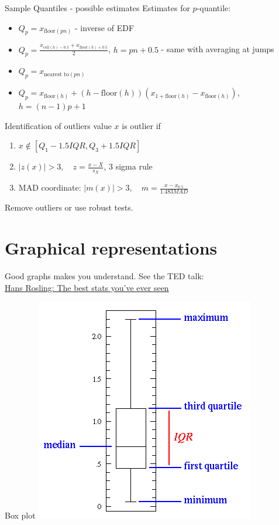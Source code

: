 \documentclass[smaller, hyperref={colorlinks=true}]{beamer}
\def\abs#1{\lvert#1\rvert}
\def\xskip{{\vspace{2ex}}}
\begin{document}
\begin{frame}{Sample Quantiles - possible estimates}
Estimates for $p$-quantile: 
\begin{itemize}
 \item $Q_p = x_{\text{floor}(pn)}$	- inverse of EDF
 \item $Q_p = \frac{x_{\text{ceil}(h)-0.5} + x_{\text{floor}(h)+0.5}}{2}$, $h=pn+0.5$ - same with averaging at jumps
 \item $Q_p = x_{\text{nearest to}(pn)}$ 
 \item $Q_p = x_{\text{floor}(h)} + (h - \text{floor}(h))(x_{1+\text{floor}(h) } - x_{\text{floor}(h)} ) $, $h=(n-1)p+1$ 
\end{itemize} 
\end{frame}


\begin{frame}{Identification of outliers}
value $x$ is outlier if
\begin{enumerate}
\item $x \notin [ Q_1 - 1.5 IQR, Q_3 + 1.5 IQR]$
\item $\abs{z(x)} > 3,\quad z = \frac{x - \overline{X}}{s_X}$, 3 sigma rule
\item MAD coordinate: $\abs{m(x)} > 3, \quad m = \frac{x - x_{0.5}}{1.483 MAD}$
\end{enumerate}

\xskip
Remove outliers or use robust tests.
\end{frame}




\section{Graphical representations}

\begin{frame}{Good graphs makes you understand.}
 See the TED talk:\\
 \href{http://www.ted.com/talks/hans_rosling_shows_the_best_stats_you_ve_ever_seen?language=en}{Hans Rosling: The best stats you've ever seen}
\end{frame}


\begin{frame}{Box plot}
\includegraphics[scale=0.5]{01_simple_box_defs.png} 
\end{frame}
\end{document}
